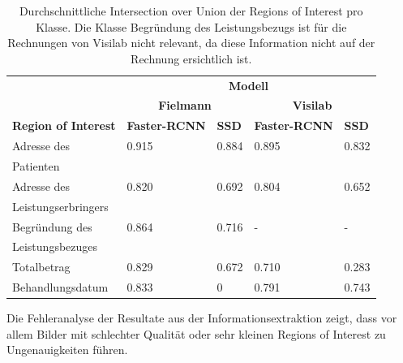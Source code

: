 \begin{table}[h!]
    \centering
    \captionsetup{width=.9\linewidth}
    \caption[Durchschnittliche Intersection over Union der Regions of Interest pro Klasse]{Durchschnittliche Intersection over Union der Regions of Interest pro Klasse. Die Klasse Begründung des Leistungsbezugs ist für die Rechnungen von Visilab nicht relevant, da diese Information nicht auf der Rechnung ersichtlich ist.}
    \label{tab:specific-ie-iou}
    \begin{tabular}{|l|l|l|l|l|}
    \hhline{~|----|}    
    \multicolumn{1}{c|}{}
                                    & \multicolumn{4}{c|}{\cellcolor[HTML]{C0E5FD}\textbf{Modell}}  \\
    \hhline{~|--|--|}
    \multicolumn{1}{c|}{}
                                    & \multicolumn{2}{c|}{\cellcolor[HTML]{C0E5FD}\textbf{Fielmann}} 
                                                            & \multicolumn{2}{c|}{\cellcolor[HTML]{C0E5FD}\textbf{Visilab}} \\
    \hline
    \rowcolor[HTML]{C0E5FD}     
    \textbf{Region of Interest}     & \textbf{Faster-RCNN}  & \textbf{SSD}        & \textbf{Faster-RCNN}  & \textbf{SSD} \\
    \hline
    Adresse des                     & 0.915    & 0.884      & 0.895 & 0.832 \\
    Patienten &&&& \\
    \hline
    Adresse des                     & 0.820    & 0.692      & 0.804 & 0.652 \\
    Leistungserbringers &&&& \\
    \hline
    Begründung des                  & 0.864    & 0.716      & - & - \\
    Leistungsbezuges &&&& \\
    \hline
    Totalbetrag                     & 0.829    & 0.672      & 0.710 & 0.283 \\
    \hline
    Behandlungsdatum                & 0.833    & 0          & 0.791 & 0.743 \\
    \hline
    \end{tabular}
\end{table}

Die Fehleranalyse der Resultate aus der Informationsextraktion zeigt, dass vor allem Bilder mit schlechter Qualität oder sehr kleinen Regions of Interest zu Ungenauigkeiten führen.

